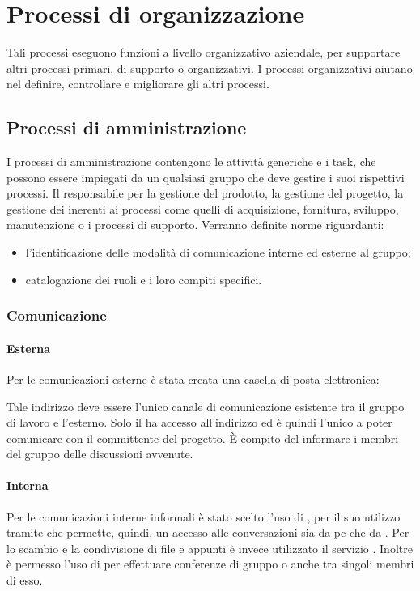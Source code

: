 \documentclass[12pt,a4paper]{article}
\begin{document}
\newpage

\section{Processi di organizzazione}
Tali processi eseguono funzioni a livello organizzativo aziendale, per supportare altri processi primari, di supporto o organizzativi.
I processi organizzativi aiutano nel definire, controllare e migliorare gli altri processi.

\subsection{Processi di amministrazione}
I processi di amministrazione contengono le attività generiche e i task, che possono essere impiegati da un qualsiasi gruppo che deve gestire i suoi rispettivi processi. Il \PM{} responsabile per la gestione del prodotto, la gestione del progetto, la gestione dei  inerenti ai processi come quelli di acquisizione, fornitura, sviluppo, manutenzione o i processi di supporto. Verranno definite norme riguardanti:
\begin{itemize}
	\item l'identificazione delle modalità di comunicazione interne ed esterne al gruppo;
	\item catalogazione dei ruoli e i loro compiti specifici.
\end{itemize}

\subsubsection{Comunicazione}
\paragraph{Esterna}
Per le comunicazioni esterne è stata creata una casella di posta elettronica:
\begin{center}
	\href{mailto:\mailGruppo{}}{\mailGruppo{}}
\end{center}
Tale indirizzo deve essere l'unico canale di comunicazione esistente tra il gruppo di lavoro e l'esterno. Solo il \PM{} ha accesso all'indirizzo ed è quindi l'unico a poter comunicare con il committente del progetto. È compito del \PM{} informare i membri del gruppo delle discussioni avvenute.

\paragraph{Interna}
Per le comunicazioni interne informali è stato scelto l'uso di , per il suo utilizzo tramite  che permette, quindi, un accesso alle conversazioni sia da pc che da . Per lo scambio e la condivisione di file e appunti è invece utilizzato il servizio  . Inoltre è permesso l'uso di  per effettuare conferenze di gruppo o anche tra singoli membri di esso.
\end{document}
